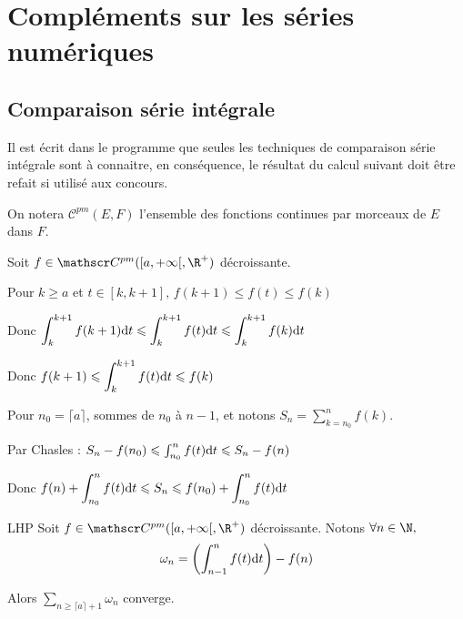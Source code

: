 \section{Compléments sur les séries numériques}
\subsection{Comparaison série intégrale}

Il est écrit dans le programme que seules les techniques de comparaison série intégrale sont à connaitre, en conséquence, le résultat du calcul suivant doit être refait si utilisé aux concours. 

On notera $\mathscr C^{pm}(E, F)$ l'ensemble des fonctions continues par morceaux de $E$ dans $F$.

Soit $f \in \mathscr C^{pm}( [a, + \infty[ , \R^+)$ décroissante. 

Pour $k \geqslant a$ et $ t \in [k, k+ 1 ], \, f(k + 1) \leqslant f(t) \leqslant f(k)$

Donc $\displaystyle \int_{k}^{k + 1} f(k + 1) \text d t \leqslant \int_{k}^{k + 1} f(t) \text d t \leqslant \int_{k}^{k + 1} f(k) \text d t$

Donc $\displaystyle f(k + 1) \leqslant \int_{k}^{k + 1} f(t) \text d t \leqslant f(k)$

Pour $n_0 = \lceil a \rceil$, sommes de $n_0$ à $n - 1$, et notons $\displaystyle S_n = \sum_{k = n_0}^{n} f(k)$.

Par Chasles : $S_n - f(n_0) \leqslant \int_{n_0}^{n} f(t) \text d t \leqslant S_n - f(n)$

Donc $\displaystyle f(n) + \int_{n_0}^{n} f(t) \text d t \leqslant S_n \leqslant f(n_0) + \int_{n_0}^{n} f(t) \text d t$

\begin{theoreme}{LHP}{}
    Soit $f \in \mathscr C^{pm}([a, + \infty[, \R^+)$ décroissante. 
    Notons $\forall n \in \N,$ 
    \[\omega_n = \left( \int_{n - 1 }^{n } f(t) \text d t \right) - f(n)\]

    Alors $\displaystyle \sum_{n \geqslant \lceil a \rceil + 1} \omega_n$ converge.
\end{theoreme}


